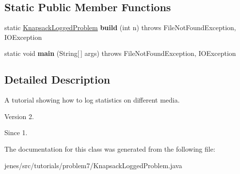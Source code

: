 \subsection*{Static Public Member Functions}
\begin{DoxyCompactItemize}
\item 
\hypertarget{classjenes_1_1tutorials_1_1problem7_1_1_knapsack_logged_problem_a541dbb7113b95fa6e579502e847ac36f}{static \hyperlink{classjenes_1_1tutorials_1_1problem7_1_1_knapsack_logged_problem}{Knapsack\-Logged\-Problem} {\bfseries build} (int n)  throws File\-Not\-Found\-Exception, I\-O\-Exception }\label{classjenes_1_1tutorials_1_1problem7_1_1_knapsack_logged_problem_a541dbb7113b95fa6e579502e847ac36f}

\item 
\hypertarget{classjenes_1_1tutorials_1_1problem7_1_1_knapsack_logged_problem_ab2896c85405a58a8a2c3474375bf2ac8}{static void {\bfseries main} (String\mbox{[}$\,$\mbox{]} args)  throws File\-Not\-Found\-Exception, I\-O\-Exception }\label{classjenes_1_1tutorials_1_1problem7_1_1_knapsack_logged_problem_ab2896c85405a58a8a2c3474375bf2ac8}

\end{DoxyCompactItemize}


\subsection{Detailed Description}
A tutorial showing how to log statistics on different media.

\begin{DoxyVersion}{Version}
2. 
\end{DoxyVersion}
\begin{DoxySince}{Since}
1. 
\end{DoxySince}


The documentation for this class was generated from the following file\-:\begin{DoxyCompactItemize}
\item 
jenes/src/tutorials/problem7/Knapsack\-Logged\-Problem.\-java\end{DoxyCompactItemize}
